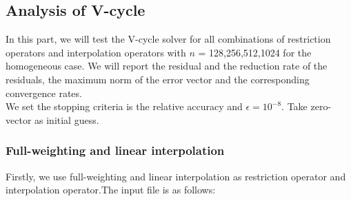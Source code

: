 \documentclass[a4paper,twocolumn]{article}
\theoremstyle{definition}
\begin{document}
\subsection{Analysis of V-cycle}
In this part, we will test the V-cycle solver for all combinations of restriction operators and interpolation operators with $n$ = 128,256,512,1024 for the homogeneous case. We will report the residual and the reduction rate of the residuals, the maximum norm of the error vector and the corresponding convergence rates.\\
We set the stopping criteria is the relative accuracy and $\epsilon = 10^{-8}$. Take zero-vector  as initial guess.
\subsubsection{Full-weighting and linear interpolation}
Firstly, we use full-weighting and linear interpolation as restriction operator and interpolation operator.The input file is as follows:
\\
\end{document}
